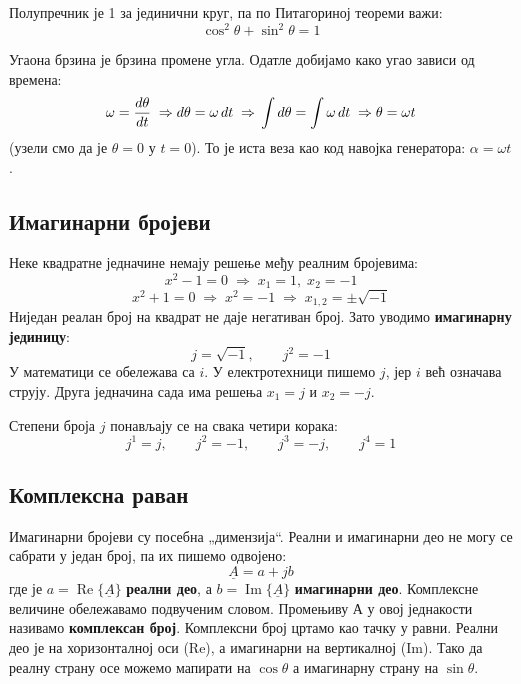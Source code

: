 \documentclass{article}
\begin{document}
Полупречник је 1 за јединични круг, па по Питагориној теореми важи:
\begin{equation}
    \cos^2\theta + \sin^2\theta = 1
\end{equation}

Угаона брзина је брзина промене угла. Одатле добијамо како угао зависи од времена:
\[
    \omega = \frac{d\theta}{dt}
    \;\Rightarrow\; \\  d\theta = \omega\,dt
    \;\Rightarrow\; \\ \int d\theta = \int \omega\,dt
    \;\Rightarrow\; \\ \theta = \omega t
\]
(узели смо да је $\theta = 0$ у $t = 0$). То је иста веза као код навојка генератора: $\alpha = \omega t$.

\subsection{Имагинарни бројеви}

Неке квадратне једначине немају решење међу реалним бројевима:
\[
    x^2 - 1 = 0 \;\Rightarrow\; x_1 = 1,\; x_2 = -1
\]
\[
    x^2 + 1 = 0 \;\Rightarrow\; x^2 = -1 \;\Rightarrow\; x_{1,2} = \pm\sqrt{-1}
\]
Ниједан реалан број на квадрат не даје негативан број. Зато уводимо \textbf{имагинарну јединицу}:
\begin{equation}
    j = \sqrt{-1}, \qquad j^2 = -1
\end{equation}
У математици се обележава са $i$. У електротехници пишемо $j$, јер $i$ већ означава струју. Друга једначина сада има решења $x_1 = j$ и $x_2 = -j$.

Степени броја $j$ понављају се на свака четири корака:
\[
    j^1 = j, \qquad j^2 = -1, \qquad j^3 = -j, \qquad j^4 = 1
\]

\subsection{Комплексна раван}

Имагинарни бројеви су посебна „димензија“. Реални и имагинарни део не могу се сабрати у један број, па их пишемо одвојено:
\begin{equation}
    \underline{A} = a + jb
\end{equation}
где је $a = \operatorname{Re}\{\underline{A}\}$ \textbf{реални део}, а $b = \operatorname{Im}\{\underline{A}\}$ \textbf{имагинарни део}. Комплексне величине обележавамо подвученим словом. Промењиву $А$ у овој једнакости називамо \textbf{комплексан  број}. Комплексни број цртамо као тачку у равни. Реални део је на хоризонталној оси (Re), а имагинарни на вертикалној (Im). Тако да реалну страну осе можемо мапирати на 
$\cos\theta$ а имагинарну страну на $\sin\theta$.
\end{document}
